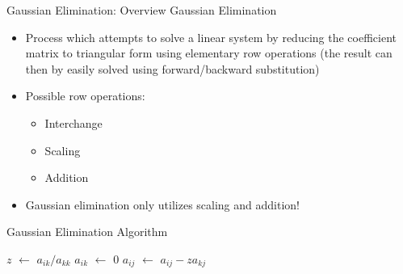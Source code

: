\documentclass[9pt, serif]{beamer}
\newlength{\wideitemsep}
\let\olditem\item
\renewcommand{\item}{\setlength{\itemsep}{\wideitemsep}\olditem}
\newcommand{\bi}{\begin{itemize}}
\newcommand{\ei}{\end{itemize}}
\newcommand*\Let[2]{\State #1 $\gets$ #2}
\begin{document}


\begin{frame}{Gaussian Elimination: Overview}
    Gaussian Elimination \pause
    \bi
        \item Process which attempts to solve a linear system by reducing the coefficient matrix to triangular form using elementary row operations (the result can then by easily solved using forward/backward substitution) \pause
        \item Possible row operations:
        \bi
            \item Interchange
            \item Scaling
            \item Addition
        \ei \pause
        \item Gaussian elimination only utilizes scaling and addition!
    \ei
\end{frame}


\begin{frame}{Gaussian Elimination Algorithm}
    \begin{algorithmic}[1]
                    \Let{$z$}{$a_{ik}/a_{kk}$}
                    \Let{$a_{ik}$}{$0$}
                        \Let{$a_{ij}$}{$a_{ij}-za_{kj}$}
                    \EndFor
                \EndFor
            \EndFor
            \vspace{-5mm}
            \State {}
        \EndFunction
    \end{algorithmic}
\end{frame}
\end{document}
